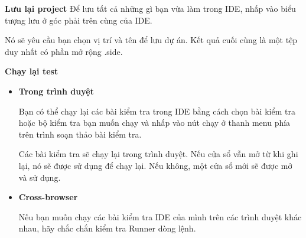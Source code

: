 \textbf{Lưu lại project}
Để lưu tất cả những gì bạn vừa làm trong IDE, nhấp vào biểu tượng lưu ở góc phải trên cùng của IDE.

Nó sẽ yêu cầu bạn chọn vị trí và tên để lưu dự án. Kết quả cuối cùng là một tệp duy nhất có phần mở rộng .side.


\textbf{Chạy lại test}
\begin{itemize}
    \item \textbf{Trong trình duyệt}
    
    Bạn có thể chạy lại các bài kiểm tra trong IDE bằng cách chọn bài kiểm tra hoặc bộ kiểm tra bạn muốn chạy và nhấp vào nút chạy ở thanh menu phía trên trình soạn thảo bài kiểm tra.
    
    Các bài kiểm tra sẽ chạy lại trong trình duyệt. Nếu cửa sổ vẫn mở từ khi ghi lại, nó sẽ được sử dụng để chạy lại. Nếu không, một cửa sổ mới sẽ được mở và sử dụng.

    \item \textbf{Cross-browser}
    
    Nếu bạn muốn chạy các bài kiểm tra IDE của mình trên các trình duyệt khác nhau, hãy chắc chắn kiểm tra Runner dòng lệnh.
\end{itemize}



